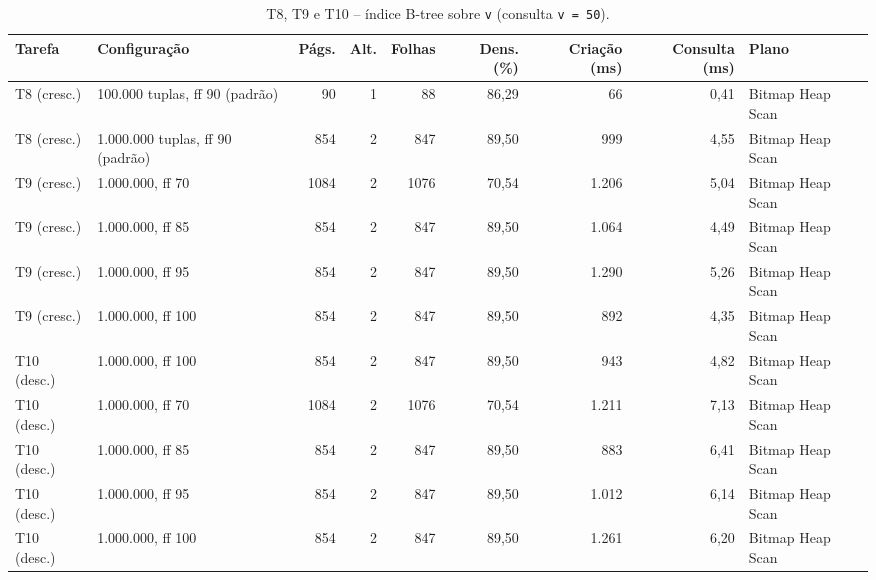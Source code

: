 \documentclass[11pt,a4paper]{article}
\begin{document}
\begin{table}[H]\centering\small
\caption{T8, T9 e T10 -- índice B-tree sobre \texttt{v} (consulta \texttt{v = 50}).}\label{tab:t8910}
\begin{adjustbox}{max width=\linewidth}\begin{tabular}{llrrrrrrl}
\toprule
Tarefa & Configuração & Págs. & Alt. & Folhas & Dens. (\%) & Criação (ms) & Consulta (ms) & Plano \\
\midrule
T8 (cresc.) & 100.000 tuplas, ff 90 (padrão) & 90 & 1 & 88 & 86,29 & 66 & 0,41 & Bitmap Heap Scan \\
T8 (cresc.) & 1.000.000 tuplas, ff 90 (padrão) & 854 & 2 & 847 & 89,50 & 999 & 4,55 & Bitmap Heap Scan \\
T9 (cresc.) & 1.000.000, ff 70 & 1084 & 2 & 1076 & 70,54 & 1.206 & 5,04 & Bitmap Heap Scan \\
T9 (cresc.) & 1.000.000, ff 85 & 854 & 2 & 847 & 89,50 & 1.064 & 4,49 & Bitmap Heap Scan \\
T9 (cresc.) & 1.000.000, ff 95 & 854 & 2 & 847 & 89,50 & 1.290 & 5,26 & Bitmap Heap Scan \\
T9 (cresc.) & 1.000.000, ff 100 & 854 & 2 & 847 & 89,50 & 892 & 4,35 & Bitmap Heap Scan \\
T10 (desc.) & 1.000.000, ff 100 & 854 & 2 & 847 & 89,50 & 943 & 4,82 & Bitmap Heap Scan \\
T10 (desc.) & 1.000.000, ff 70 & 1084 & 2 & 1076 & 70,54 & 1.211 & 7,13 & Bitmap Heap Scan \\
T10 (desc.) & 1.000.000, ff 85 & 854 & 2 & 847 & 89,50 & 883 & 6,41 & Bitmap Heap Scan \\
T10 (desc.) & 1.000.000, ff 95 & 854 & 2 & 847 & 89,50 & 1.012 & 6,14 & Bitmap Heap Scan \\
T10 (desc.) & 1.000.000, ff 100 & 854 & 2 & 847 & 89,50 & 1.261 & 6,20 & Bitmap Heap Scan \\
\bottomrule
\end{tabular}\end{adjustbox}
\end{table}
\end{document}
